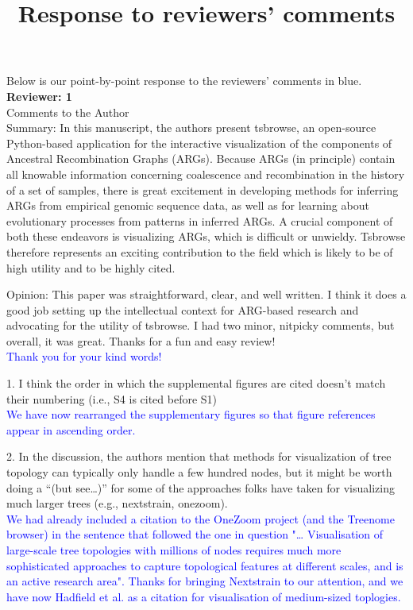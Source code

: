 \documentclass{article}
\title{Response to reviewers' comments}
\begin{document}
\maketitle

Below is our point-by-point response to the reviewers' comments in blue.\\

\textbf{Reviewer: 1}\\

Comments to the Author \\

Summary: In this manuscript, the authors present tsbrowse, an open-source Python-based 
application for the interactive visualization of the components of Ancestral Recombination 
Graphs (ARGs). Because ARGs (in principle) contain all knowable information concerning 
coalescence and recombination in the history of a set of samples, there is great excitement 
in developing methods for inferring ARGs from empirical genomic sequence data, as well as 
for learning about evolutionary processes from patterns in inferred ARGs. A crucial component 
of both these endeavors is visualizing ARGs, which is difficult or unwieldy. Tsbrowse therefore 
represents an exciting contribution to the field which is likely to be of high utility and 
to be highly cited.

Opinion: This paper was straightforward, clear, and well written. I think it does a good job 
setting up the intellectual context for ARG-based research and advocating for the utility of 
tsbrowse. I had two minor, nitpicky comments, but overall, it was great. Thanks for a fun and 
easy review!\\
\textcolor{blue}{Thank you for your kind words!}

1. I think the order in which the supplemental figures are cited doesn’t match their numbering 
(i.e., S4 is cited before S1)\\
\textcolor{blue}{We have now rearranged the supplementary figures so that figure references 
appear in ascending order.}

2. In the discussion, the authors mention that methods for visualization of tree topology can 
typically only handle a few hundred nodes, but it might be worth doing a ``(but see…)'' for some 
of the approaches folks have taken for visualizing much larger trees (e.g., nextstrain, onezoom).\\
\textcolor{blue}{We had already included a citation to the OneZoom project (and the Treenome browser) in the 
sentence that followed the one in question "… Visualisation of large-scale tree topologies with millions of nodes 
requires much more sophisticated approaches to capture topological features at different scales, 
and is an active research area". Thanks for bringing Nextstrain to our 
attention, and we have now Hadfield et al. as a citation for visualisation of medium-sized toplogies.}\\
\end{document}

